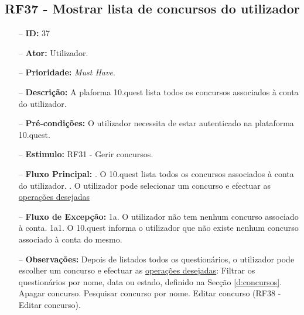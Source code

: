 \subsection{RF37 - Mostrar lista de concursos do utilizador}
\begin{itemize}
	\item[--] \textbf{ID:} 37
	\item[--]  \textbf{Ator:} Utilizador.
	\item[--]  \textbf{Prioridade:} \textit{Must Have}.
	\item[--]  \textbf{Descrição:} A plaforma 10.quest lista todos os concursos associados à conta do utilizador.
	\item[--]  \textbf{Pré-condições:} O utilizador necessita de estar autenticado na plataforma 10.quest.
	\item[--]  \textbf{Estimulo:} RF31 - Gerir concursos.
	\item[--]  \textbf{Fluxo Principal:} 
	. O 10.quest lista todos os concursos associados à conta do utilizador.
	. O utilizador pode selecionar um concurso e efectuar as \underline{operações desejadas}
	\item[--]  \textbf{Fluxo de Excepção:} 
	\subitem 1a. O utilizador não tem nenhum concurso associado à conta.
	\subitem 1a1. O 10.quest informa o utilizador que não existe nenhum concurso  associado à conta do mesmo.
	\item[--]  \textbf{Observações:} Depois de listados todos os questionários, o utilizador pode escolher um concurso e efectuar as \underline{operações desejadas}:
	\subitem Filtrar os questionários por nome, data ou estado, definido na Secção \ref{d:concursos}.
	\subitem Apagar concurso.
	\subitem Pesquisar concurso por nome.
	\subitem Editar concurso (RF38 - Editar concurso).
\end{itemize}
\newpage

